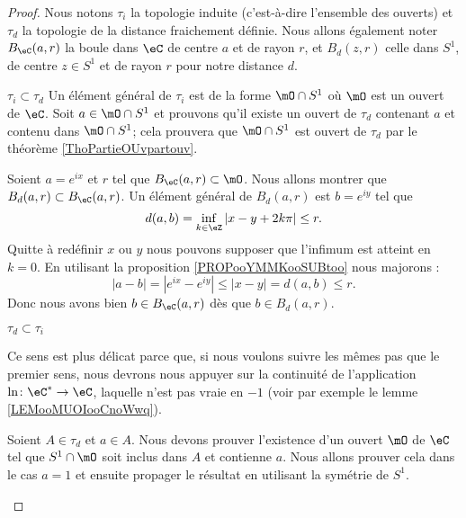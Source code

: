 \begin{proof}
    Nous notons \( \tau_i\) la topologie induite (c'est-à-dire l'ensemble des ouverts) et \( \tau_d\) la topologie de la distance fraichement définie. Nous allons également noter \( B_{\eC}(a,r)\) la boule dans \( \eC\) de centre \( a\) et de rayon \( r\), et \( B_d(z,r)\) celle dans \( S^1\), de centre \( z\in S^1\) et de rayon \( r\) pour notre distance \( d\).
    \begin{subproof}
        
    \item[\( \tau_i\subset\tau_d\)]
        Un élément général de \( \tau_i\) est de la forme \( \mO\cap S^1\) où \( \mO\) est un ouvert de \( \eC\). Soit \( a\in \mO\cap S^1\) et prouvons qu'il existe un ouvert de \( \tau_d\) contenant \( a\) et contenu dans \( \mO\cap S^1\); cela prouvera que \( \mO\cap S^1\) est ouvert de \( \tau_d\) par le théorème \ref{ThoPartieOUvpartouv}.

        Soient \( a= e^{ix}\) et \( r\) tel que \( B_{\eC}(a,r)\subset \mO\). Nous allons montrer que \( B_{d}(a,r)\subset B_{\eC}(a,r)\). Un élément général de \( B_d(a,r)\) est \( b= e^{iy}\) tel que
        \begin{equation}
            d(a,b)=\inf_{k\in \eZ}| x-y+2k\pi |\leq r.
        \end{equation}
        Quitte à redéfinir \( x\) ou \( y\) nous pouvons supposer que l'infimum est atteint en \( k=0\). En utilisant la proposition \ref{PROPooYMMKooSUBtoo} nous majorons :
        \begin{equation}
            | a-b |=|  e^{ix}- e^{iy} |\leq | x-y |=d(a,b)\leq r.
        \end{equation}
        Donc nous avons bien \( b\in B_{\eC}(a,r)\) dès que \( b\in B_d(a,r)\).

    \item[\( \tau_d\subset \tau_i\)]

        Ce sens est plus délicat parce que, si nous voulons suivre les mêmes pas que le premier sens, nous devrons nous appuyer sur la continuité de l'application \( \ln\colon \eC^*\to \eC\), laquelle n'est pas vraie en \( -1\) (voir par exemple le lemme \ref{LEMooMUOIooCnoWwq}).

        Soient \( A\in \tau_d\) et \( a\in A\). Nous devons prouver l'existence d'un ouvert \( \mO\) de \( \eC\) tel que \( S^1\cap\mO\) soit inclus dans \( A\) et contienne \( a\). Nous allons prouver cela dans le cas \( a=1\) et ensuite propager le résultat en utilisant la symétrie de \( S^1\).


\end{subproof}
\end{proof}
